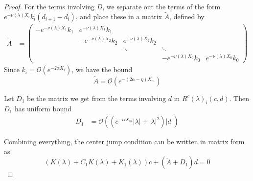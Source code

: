 \documentclass[thesis.tex]{subfiles}
\begin{document}
\begin{lemma}
\begin{proof}
For the terms involving $D$, we separate out the terms of the form $e^{-\nu(\lambda)X_i} k_i (d_{i+1} - d_i)$, and place these in a matrix $\tilde{A}$, defined by
\begin{align*}
\tilde{A} &= \begin{pmatrix}
-e^{-\nu(\lambda)X_1} k_1 & e^{-\nu(\lambda)X_1} k_1 \\
& -e^{-\nu(\lambda)X_2} k_2 & e^{-\nu(\lambda)X_2} k_2 \\
& & \ddots & \ddots \\
& &  & -e^{-\nu(\lambda)X_0} k_0 & e^{-\nu(\lambda)X_0} k_0
\end{pmatrix}
\end{align*}
Since $k_i = \mathcal{O}(e^{-2 \alpha X_i})$, we have the bound
\[
\tilde{A} = \mathcal{O}(e^{-(2\alpha - \eta) X_m})
\]

Let $D_1$ be the matrix we get from the terms involving $d$ in $R^c(\lambda)_i(c, d)$. Then $D_1$ has uniform bound
\begin{align*}
D_1 &= \mathcal{O}((e^{-\alpha X_m}|\lambda| + |\lambda|^2) |d|)
\end{align*}

Combining everything, the center jump condition can be written in matrix form as
\[
(K(\lambda) + C_1 K(\lambda) + K_1(\lambda)) c + (\tilde{A} + D_1) d = 0
\]
\end{proof}
\end{lemma}
\end{document}
